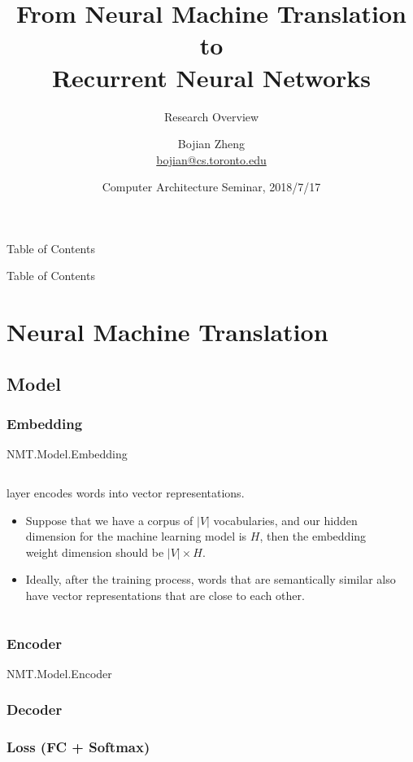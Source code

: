 \documentclass[professionalfonts]{beamer}
\begin{document}
  \title[From NMT to RNN]{From Neural Machine Translation to \\
    Recurrent Neural Networks}
  \subtitle{Research Overview}
  \author[Bojian Zheng]
  {
    Bojian Zheng \\
    \url{bojian@cs.toronto.edu}
  }
  \date[CompArch Seminar]{Computer Architecture Seminar, 2018/7/17}
  \frame{\titlepage}

  \begin{frame}{Table of Contents}
    \tableofcontents
  \end{frame}

  \AtBeginSubsection
  {
    \begin{frame}{Table of Contents}
    \end{frame}
  }

  \section{Neural Machine Translation}
  \subsection{Model}
  \subsubsection{Embedding}
  \begin{frame}{NMT.Model.Embedding}
    \begin{columns}
      \begin{column}{0.69\linewidth}
         layer encodes words into vector representations.
        \begin{itemize}
          \item <1-> Suppose that we have a corpus of \(|V|\) vocabularies, 
          and our hidden dimension for the machine learning model is \(H\),
          then the embedding weight dimension should be \(|V|\times H\).
          \item <2-> Ideally, after the training process, 
          words that are semantically similar also have vector representations that are close to each other.
        \end{itemize}
      \end{column}
      \begin{column}{0.29\linewidth}
        
      \end{column}
    \end{columns}
  \end{frame}
  \subsubsection{Encoder}
  \begin{frame}{NMT.Model.Encoder}
  \end{frame}
  \subsubsection{Decoder}
  \subsubsection{Loss (FC + Softmax)}
  
\end{document}
